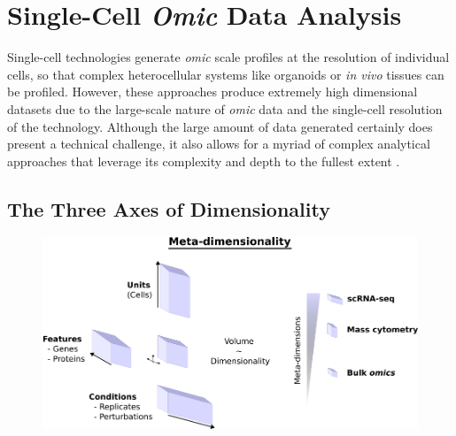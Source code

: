 \section{Single-Cell \emph{Omic} Data Analysis}

Single-cell technologies generate \emph{omic} scale profiles at the resolution of individual cells, so that complex heterocellular systems like organoids or \textit{in vivo} tissues can be profiled.
However, these approaches produce extremely high dimensional datasets due to the large-scale nature of \emph{omic} data and the single-cell resolution of the technology. Although the large amount of data generated certainly does present a technical challenge, it also allows for a myriad of complex analytical approaches that leverage its complexity and depth to the fullest extent \cite{mincarelli_defining_2018,qin_deciphering_2020}. 

\subsection{The Three Axes of Dimensionality}

\begin{figure}
    \centering
    \includegraphics{01intro/figs/1COMP_dims.png}
    \caption{}
    \label{fig:1dims}
\end{figure}


